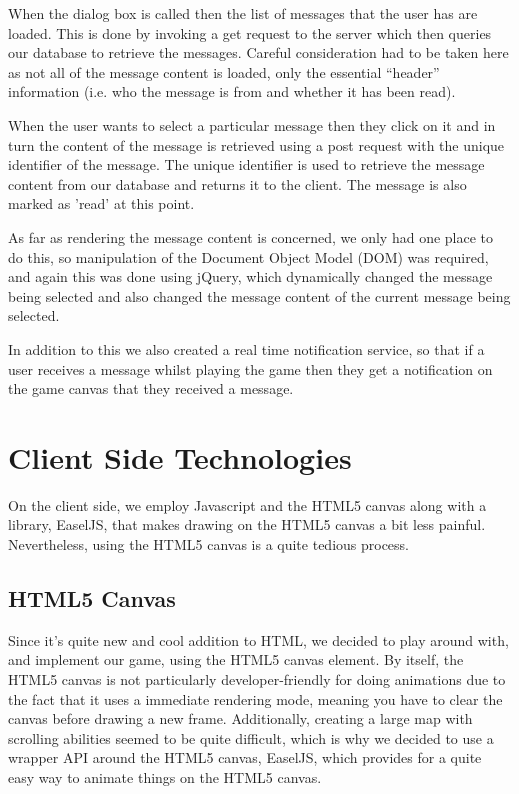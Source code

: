 \documentclass[a4paper,11pt]{article}
\begin{document}
		When the dialog box is called then the list of messages that the user has are loaded. This is done by invoking a get request to the server which then queries our database to retrieve the messages. Careful consideration had to be taken here as not all of the message content is loaded, only the essential ``header'' information (i.e. who the message is from and whether it has been read).

		When the user wants to select a particular message then they click on it and in turn the content of the message is retrieved using a post request with the unique identifier of the message. The unique identifier is used to retrieve the message content from our database and returns it to the client. The message is also marked as 'read' at this point.

		As far as rendering the message content is concerned, we only had one place to do this, so manipulation of the Document Object Model (DOM) was required, and again this was done using jQuery, which dynamically changed the message being selected and also changed the message content of the current message being selected.

		In addition to this we also created a real time notification service, so that if a user receives a message whilst playing the game then they get a notification on the game canvas that they received a message.
		
		
	
	\section{Client Side Technologies}
		On the client side, we employ Javascript and the HTML5 canvas along with a library, EaselJS, that makes drawing on the HTML5 canvas a bit less painful. Nevertheless, using the HTML5 canvas is a quite tedious process.
	
		\subsection{HTML5 Canvas}
			Since it's quite new and cool addition to HTML, we decided to play around with, and implement our game, using the HTML5 canvas element. By itself, the HTML5 canvas is not particularly developer-friendly for doing animations due to the fact that it uses a immediate rendering mode, meaning you have to clear the canvas before drawing a new frame. Additionally, creating a large map with scrolling abilities seemed to be quite difficult, which is why we decided to use a wrapper API around the HTML5 canvas, EaselJS, which provides for a quite easy way to animate things on the HTML5 canvas.
			
\end{document}
